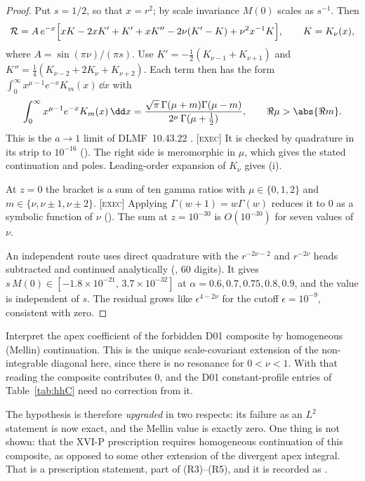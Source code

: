 \begin{proof}
Put \(s=1/2\), so that \(x=r^2\); by scale invariance
\(M(0)\) scales as \(s^{-1}\).
Then
\[
\mathcal R=A\,e^{-x}\Bigl[xK-2xK'+K'+xK''
-2\nu(K'-K)+\nu^2x^{-1}K\Bigr],
\qquad K=K_\nu(x),
\]
where \(A=\sin(\pi\nu)/(\pi s)\).
Use \(K'=-\tfrac12(K_{\nu-1}+K_{\nu+1})\) and
\(K''=\tfrac14(K_{\nu-2}+2K_\nu+K_{\nu+2})\).
Each term then has the form
\(\int_0^\infty x^{\mu-1}e^{-x}K_m(x)\,\dd x\) with
\[
\int_0^\infty x^{\mu-1}e^{-x}K_m(x)\,\dd x
=\frac{\sqrt\pi\,\Gamma(\mu+m)\Gamma(\mu-m)}
{2^\mu\,\Gamma(\mu+\tfrac12)},
\qquad \Re\mu>\abs{\Re m}.
\]
This is the \(a\to1\) limit of DLMF~10.43.22 \cite{DLMF}.
\textsc{[exec]} It is checked by quadrature in its strip to
\(10^{-16}\) ().
The right side is meromorphic in \(\mu\), which gives the stated
continuation and poles.
Leading-order expansion of \(K_\nu\) gives (i).

At \(z=0\) the bracket is a sum of ten gamma ratios with
\(\mu\in\{0,1,2\}\) and \(m\in\{\nu,\nu\pm1,\nu\pm2\}\).
\textsc{[exec]} Applying \(\Gamma(w+1)=w\Gamma(w)\) reduces it
to \(0\) as a symbolic function of \(\nu\)
().
The sum at \(z=10^{-30}\) is \(O(10^{-30})\) for seven values of
\(\nu\).

An independent route uses direct quadrature with the
\(r^{-2\nu-2}\) and \(r^{-2\nu}\) heads subtracted and continued
analytically (, 60 digits).
It gives \(s\,M(0)\in[-1.8\times10^{-21},\,3.7\times10^{-32}]\)
at \(\alpha=0.6,0.7,0.75,0.8,0.9\), and the value is independent
of \(s\).
The residual grows like \(\epsilon^{4-2\nu}\) for the cutoff
\(\epsilon=10^{-9}\), consistent with zero.
\end{proof}

\begin{corollary}
\label{cor:HI}
Interpret the apex coefficient of the forbidden D01 composite by
homogeneous (Mellin) continuation.
This is the unique scale-covariant extension of the
non-integrable diagonal here, since there is no resonance for
\(0<\nu<1\).
With that reading the composite contributes \(0\), and the D01
constant-profile entries of Table~\ref{tab:hhC} need no correction
from it.

The hypothesis is therefore \emph{upgraded} in two respects: its
failure as an \(L^2\) statement is now exact, and the Mellin value
is exactly zero.
One thing is not shown: that the XVI-P prescription requires
homogeneous continuation of this composite, as opposed to some
other extension of the divergent apex integral.
That is a prescription statement, part of (R3)--(R5), and it is
recorded as \CONDITIONAL.
\end{corollary}
